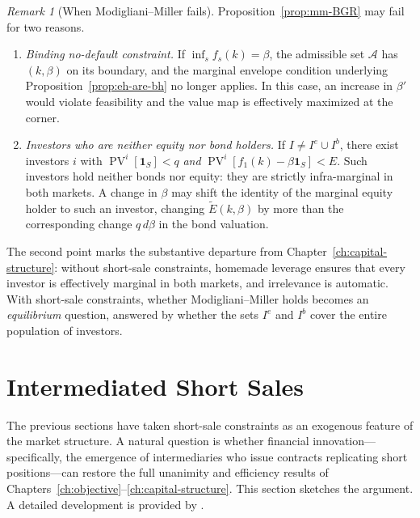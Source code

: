 \documentclass[11pt,a4paper,oneside]{book}
\def\1{\mathbf{1}}
\DeclareMathOperator{\PV}{PV}
\theoremstyle{plain}
\theoremstyle{definition}
\theoremstyle{remark}
\newtheorem{remark}[theorem]{Remark}
\numberwithin{equation}{chapter}
\begin{document}
\begin{remark}[When Modigliani--Miller fails]\label{rem:mm-fails-BGR}
Proposition~\ref{prop:mm-BGR} may fail for two reasons.
\begin{enumerate}
  \item \emph{Binding no-default constraint.}
  If $\inf_s f_s(k) = \beta$, the admissible set $\mathcal{A}$ has $(k, \beta)$ on its boundary, and the marginal envelope condition underlying Proposition~\ref{prop:eh-are-bh} no longer applies.
  In this case, an increase in $\beta'$ would violate feasibility and the value map is effectively maximized at the corner.
  \item \emph{Investors who are neither equity nor bond holders.}
  If $I \neq I^e \cup I^b$, there exist investors $i$ with $\PV^i[\1_S] < q$ \emph{and} $\PV^i[f_1(k) - \beta \1_S] < E$.
  Such investors hold neither bonds nor equity: they are strictly infra-marginal in both markets.
  A change in $\beta$ may shift the identity of the marginal equity holder to such an investor, changing $\widetilde{E}(k, \beta)$ by more than the corresponding change $q \, d\beta$ in the bond valuation.
\end{enumerate}
The second point marks the substantive departure from Chapter~\ref{ch:capital-structure}: without short-sale constraints, homemade leverage ensures that every investor is effectively marginal in both markets, and irrelevance is automatic.
With short-sale constraints, whether Modigliani--Miller holds becomes an \emph{equilibrium} question, answered by whether the sets $I^e$ and $I^b$ cover the entire population of investors.
\end{remark}

\section{Intermediated Short Sales}
\label{sec:intermediated}

The previous sections have taken short-sale constraints as an exogenous feature of the market structure.
A natural question is whether financial innovation---specifically, the emergence of intermediaries who issue contracts replicating short positions---can restore the full unanimity and efficiency results of Chapters~\ref{ch:objective}--\ref{ch:capital-structure}.
This section sketches the argument.
A detailed development is provided by \citet{BisinGottardiRuta2014}.
\end{document}
